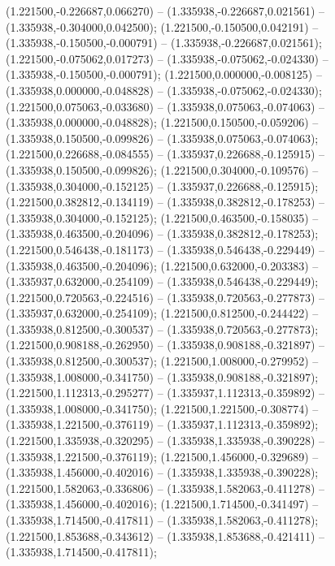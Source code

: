  (1.221500,-0.226687,0.066270) -- (1.335938,-0.226687,0.021561) -- (1.335938,-0.304000,0.042500);
 (1.221500,-0.150500,0.042191) -- (1.335938,-0.150500,-0.000791) -- (1.335938,-0.226687,0.021561);
 (1.221500,-0.075062,0.017273) -- (1.335938,-0.075062,-0.024330) -- (1.335938,-0.150500,-0.000791);
 (1.221500,0.000000,-0.008125) -- (1.335938,0.000000,-0.048828) -- (1.335938,-0.075062,-0.024330);
 (1.221500,0.075063,-0.033680) -- (1.335938,0.075063,-0.074063) -- (1.335938,0.000000,-0.048828);
 (1.221500,0.150500,-0.059206) -- (1.335938,0.150500,-0.099826) -- (1.335938,0.075063,-0.074063);
 (1.221500,0.226688,-0.084555) -- (1.335937,0.226688,-0.125915) -- (1.335938,0.150500,-0.099826);
 (1.221500,0.304000,-0.109576) -- (1.335938,0.304000,-0.152125) -- (1.335937,0.226688,-0.125915);
 (1.221500,0.382812,-0.134119) -- (1.335938,0.382812,-0.178253) -- (1.335938,0.304000,-0.152125);
 (1.221500,0.463500,-0.158035) -- (1.335938,0.463500,-0.204096) -- (1.335938,0.382812,-0.178253);
 (1.221500,0.546438,-0.181173) -- (1.335938,0.546438,-0.229449) -- (1.335938,0.463500,-0.204096);
 (1.221500,0.632000,-0.203383) -- (1.335937,0.632000,-0.254109) -- (1.335938,0.546438,-0.229449);
 (1.221500,0.720563,-0.224516) -- (1.335938,0.720563,-0.277873) -- (1.335937,0.632000,-0.254109);
 (1.221500,0.812500,-0.244422) -- (1.335938,0.812500,-0.300537) -- (1.335938,0.720563,-0.277873);
 (1.221500,0.908188,-0.262950) -- (1.335938,0.908188,-0.321897) -- (1.335938,0.812500,-0.300537);
 (1.221500,1.008000,-0.279952) -- (1.335938,1.008000,-0.341750) -- (1.335938,0.908188,-0.321897);
 (1.221500,1.112313,-0.295277) -- (1.335937,1.112313,-0.359892) -- (1.335938,1.008000,-0.341750);
 (1.221500,1.221500,-0.308774) -- (1.335938,1.221500,-0.376119) -- (1.335937,1.112313,-0.359892);
 (1.221500,1.335938,-0.320295) -- (1.335938,1.335938,-0.390228) -- (1.335938,1.221500,-0.376119);
 (1.221500,1.456000,-0.329689) -- (1.335938,1.456000,-0.402016) -- (1.335938,1.335938,-0.390228);
 (1.221500,1.582063,-0.336806) -- (1.335938,1.582063,-0.411278) -- (1.335938,1.456000,-0.402016);
 (1.221500,1.714500,-0.341497) -- (1.335938,1.714500,-0.417811) -- (1.335938,1.582063,-0.411278);
 (1.221500,1.853688,-0.343612) -- (1.335938,1.853688,-0.421411) -- (1.335938,1.714500,-0.417811);
